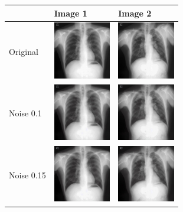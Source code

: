 \begin{table}[H]
\centering
\begin{tabularx}{\linewidth}{@{}>{\centering\arraybackslash}m{2cm}>{\centering\arraybackslash}X>{\centering\arraybackslash}X@{}}
\toprule
 & Image 1 & Image 2 \\
\midrule
Original & 
\includegraphics[valign=M,width=\linewidth,height=2.5cm,keepaspectratio]{main/content/images/sd_noise/60527.jpg} & 
\includegraphics[valign=M,width=\linewidth,height=2.5cm,keepaspectratio]{main/content/images/sd_noise/60534.jpg} \\
\midrule
Noise 0.1 & 
\includegraphics[valign=M,width=\linewidth,height=2.5cm,keepaspectratio]{main/content/images/sd_noise/noise_0.1_60527.jpg} & \includegraphics[valign=M,width=\linewidth,height=2.5cm,keepaspectratio]{main/content/images/sd_noise/noise_0.1_60534.jpg} \\
\midrule
Noise 0.15 & 
\includegraphics[valign=M,width=\linewidth,height=2.5cm,keepaspectratio]{main/content/images/sd_noise/noise_0.15_60527.jpg} & \includegraphics[valign=M,width=\linewidth,height=2.5cm,keepaspectratio]{main/content/images/sd_noise/noise_0.15_60534.jpg} \\

\end{tabularx}
\end{table}
